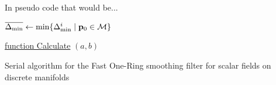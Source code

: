 In pseudo code that would be...
\begin{algorithm}
	\SetNlSkip{16pt}

	\bigskip
	\;
	$\overline{\Delta_\text{min}} \leftarrow \min\{\Delta_\text{min}^i \;|\; \mathbf{p}_0 \in \mathcal{M}\}$\;


	\bigskip
	\underline{function Calculate} $(a,b)$\;

	\caption{Serial algorithm for the Fast One-Ring smoothing filter for scalar fields on discrete manifolds\label{alg:serialfilter}}
\end{algorithm}%
%

